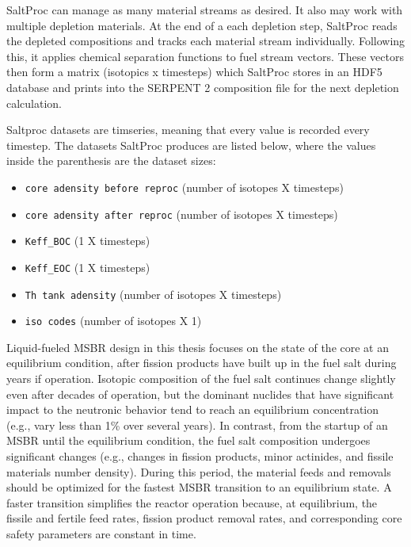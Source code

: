 SaltProc can manage as many material streams as desired. It also may work with multiple depletion materials. At the end of a each depletion
step, SaltProc reads the depleted compositions and tracks each material stream individually. Following this, it applies chemical
separation functions to fuel stream vectors. These vectors then form a matrix (isotopics x timesteps) which SaltProc stores in an HDF5 database
and prints into the SERPENT 2 composition file for the next depletion calculation.

Saltproc datasets are timseries, meaning that every value is recorded every timestep. The datasets SaltProc produces are listed below,
where the values inside the parenthesis are the dataset sizes:

\begin{itemize}
    \item \texttt{core adensity before reproc} (number of isotopes X timesteps)
    \item \texttt{core adensity after reproc} (number of isotopes X timesteps)
    \item \texttt{Keff_BOC} (1 X timesteps)
    \item \texttt{Keff_EOC} (1 X timesteps)
    \item \texttt{Th tank adensity} (number of isotopes X timesteps)
    \item \texttt{iso codes} (number of isotopes X 1)
\end{itemize}

Liquid-fueled \gls{MSBR} design in this thesis focuses on the state of the core at an equilibrium condition, after fission products have
built up in the fuel salt during years if operation. Isotopic composition of the fuel salt continues change slightly even after decades
of operation, but the dominant nuclides that have significant impact to the neutronic behavior tend to reach an equilibrium concentration
(e.g., vary less than 1\% over several years). In contrast, from the startup of an \gls{MSBR} until the equilibrium condition,
the fuel salt composition undergoes significant changes (e.g., changes in fission products, minor actinides, and fissile
materials number density). During this period, the material feeds and removals should be optimized for the fastest \gls{MSBR} transition to an
equilibrium state. A faster transition simplifies the reactor operation because, at equilibrium, the fissile and fertile feed rates,
fission product removal rates, and corresponding core safety parameters are constant in time.

